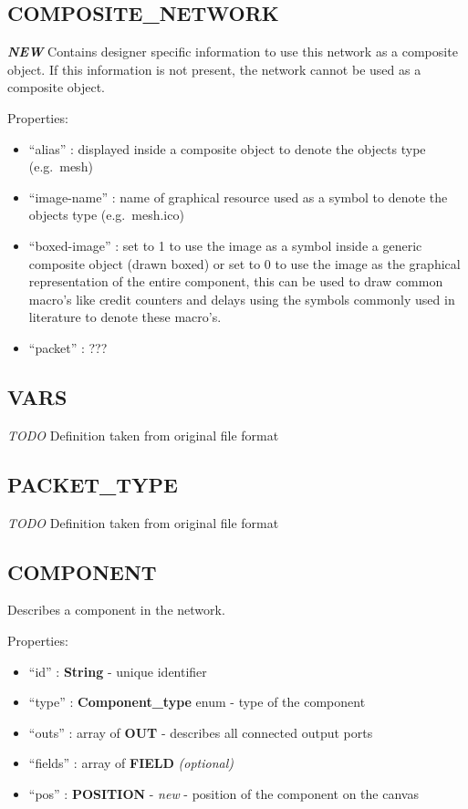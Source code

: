 \subsection{COMPOSITE\_NETWORK}\label{compositeux5fnetwork}

\textbf{\emph{NEW}} Contains designer specific information to use this
network as a composite object. If this information is not present, the
network cannot be used as a composite object.

Properties:

\begin{itemize}
\itemsep1pt\parskip0pt
\item
  ``alias'' : displayed inside a composite object to denote the objects
  type (e.g.~mesh)
\item
  ``image-name'' : name of graphical resource used as a symbol to denote
  the objects type (e.g.~mesh.ico)
\item
  ``boxed-image'' : set to 1 to use the image as a symbol inside a
  generic composite object (drawn boxed) or set to 0 to use the image as
  the graphical representation of the entire component, this can be used
  to draw common macro's like credit counters and delays using the
  symbols commonly used in literature to denote these macro's.
\item
  ``packet'' : ???
\end{itemize}

\subsection{VARS}\label{vars}

\emph{TODO} Definition taken from original file format

\subsection{PACKET\_TYPE}\label{packetux5ftype}

\emph{TODO} Definition taken from original file format

\subsection{COMPONENT}\label{component}

Describes a component in the network.

Properties:

\begin{itemize}
\itemsep1pt\parskip0pt
\item
  ``id'' : \textbf{String} - unique identifier
\item
  ``type'' : \textbf{Component\_type} enum - type of the component
\item
  ``outs'' : array of \textbf{OUT} - describes all connected output
  ports
\item
  ``fields'' : array of \textbf{FIELD} \emph{(optional)}
\item
  ``pos'' : \textbf{POSITION} - \emph{new} - position of the component
  on the canvas
\end{itemize}

